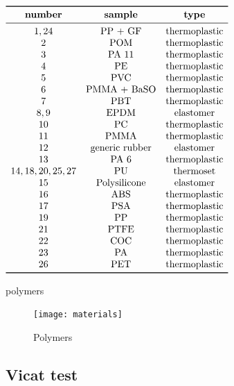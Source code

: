 \documentclass[a4paper, 11pt]{article}
\begin{document}
\begin{table}[htp]
	\centering
	$
	\begin{array}{ccc}
	\toprule
	\textbf{number} & \textbf{sample} & \textbf{type} \\
	\midrule
	1,24 & \text{PP + GF} & \text{thermoplastic}\\
	2 & \text{POM} & \text{thermoplastic}\\
	3 & \text{PA 11} & \text{thermoplastic}\\
	4 & \text{PE} & \text{thermoplastic}\\
	5 & \text{PVC} & \text{thermoplastic}\\
	6 & \text{PMMA + BaSO} & \text{thermoplastic}\\
	7 & \text{PBT} & \text{thermoplastic}\\
	8,9 & \text{EPDM} & \text{elastomer}\\
    10 & \text{PC} & \text{thermoplastic}\\
	11 & \text{PMMA} & \text{thermoplastic}\\
	12 & \text{generic rubber} & \text{elastomer}\\
	13 & \text{PA 6} & \text{thermoplastic}\\
	14,18,20,25,27 & \text{PU} & \text{thermoset}\\
	15 & \text{Polysilicone} & \text{elastomer}\\
	16 & \text{ABS} & \text{thermoplastic}\\
	17 & \text{PSA} & \text{thermoplastic}\\
	19 & \text{PP} & \text{thermoplastic}\\
	21 & \text{PTFE} & \text{thermoplastic}\\
	22 & \text{COC} & \text{thermoplastic}\\
	23 & \text{PA} & \text{thermoplastic}\\
	26 & \text{PET} & \text{thermoplastic}\\
	\bottomrule
	\end{array}
	$
	\caption{polymers}
	\label{tab:Polymers}
\end{table}


\begin{figure}[htp]
	\centering
	{\texttt{[image: materials]}}
	\captionsetup{justification=centering}
	\caption{Polymers}
	\label{fig:materials}
\end{figure}

\subsection{Vicat test}
\end{document}

